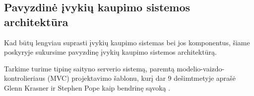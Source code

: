 






\subsection{Pavyzdinė įvykių kaupimo sistemos architektūra}

Kad būtų lengviau suprasti įvykių kaupimo sistemas bei jos komponentus, šiame poskyryje sukursime pavyzdinę įvykių kaupimo sistemos architektūrą.

Tarkime turime tipinę saityno serverio sistemą, paremtą modelio-vaizdo-kontrolieriaus (MVC) projektavimo šablonu, kurį dar 9 dešimtmetyje aprašė Glenn Krasner ir Stephen Pope kaip bendrinę sąvoką \cite{Krasner:1988:CUM:50757.50759}.

